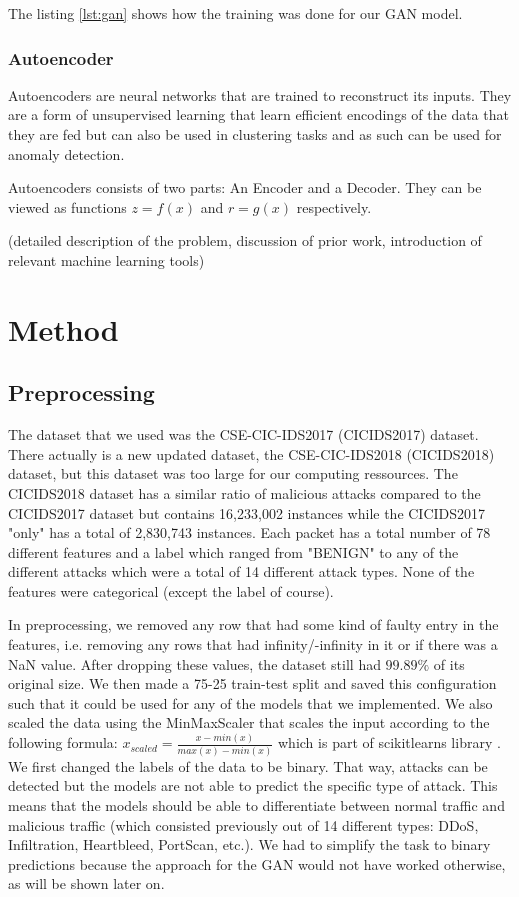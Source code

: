 \documentclass[]{article}
\begin{document}
	The listing \ref{lst:gan} shows how the training was done for our GAN model. 
 	  
 	 \subsubsection{Autoencoder}
 	  
 	  Autoencoders are neural networks that are trained to reconstruct its inputs. They are a form of unsupervised learning that learn efficient encodings of the data that they are fed but can also be used in clustering tasks and as such can be used for anomaly detection. 
 	  
 	  Autoencoders consists of two parts: An Encoder and a Decoder. They can be viewed as functions $z = f(x)$ and $r = g(x)$ respectively. 
 	  
 	  	(detailed description of the problem, discussion of prior work, introduction of relevant machine learning tools)
	 \section{Method}
	 
	 \subsection{Preprocessing}
	 The dataset that we used was the CSE-CIC-IDS2017 (CICIDS2017) dataset. There actually is a new updated dataset, the CSE-CIC-IDS2018 (CICIDS2018) dataset, but this dataset was too large for our computing ressources. The CICIDS2018 dataset has a similar ratio of malicious attacks compared to the CICIDS2017 dataset but contains 16,233,002 instances while the CICIDS2017 "only" has a total of 2,830,743 instances. Each packet has a total number of 78 different features and a label which ranged from "BENIGN" to any of the different attacks which were a total of 14 different attack types. None of the features were categorical (except the label of course). 
	 \newline
	 
	 
	 \noindent
	 In preprocessing, we removed any row that had some kind of faulty entry in the features, i.e. removing any rows that had infinity/-infinity in it or if there was a NaN value. After dropping these values, the dataset still had $99.89\%$ of its original size. We then made a 75-25 train-test split and saved this configuration such that it could be used for any of the models that we implemented. We also scaled the data using the MinMaxScaler that scales the input according to the following formula: $x_{scaled} = \frac{x-min(x)}{max(x)-min(x)}$ which is part of scikitlearns library \cite{sklearn_api}. We first changed the labels of the data to be binary. That way, attacks can be detected but the models are not able to predict the specific type of attack. This means that the models should be able to differentiate between normal traffic and malicious traffic (which consisted previously out of 14 different types: DDoS, Infiltration, Heartbleed, PortScan, etc.). We had to simplify the task to binary predictions because the approach for the GAN would not have worked otherwise, as will be shown later on. 
\end{document}

